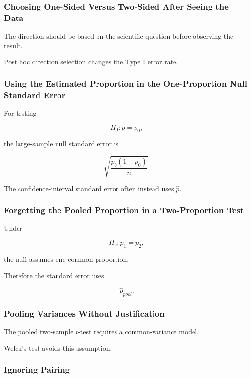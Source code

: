 \subsubsection{Choosing One-Sided Versus Two-Sided After Seeing the Data}

The direction should be based on the scientific question before
observing the result.

Post hoc direction selection changes the Type I error rate.

\subsubsection{Using the Estimated Proportion in the One-Proportion Null Standard Error}

For testing

\[
H_0:p=p_0,
\]

the large-sample null standard error is

\[
\boxed{
\sqrt{
\frac{
p_0(1-p_0)
}{n}
}.
}
\]

The confidence-interval standard error often instead uses
\(\widehat{p}\).

\subsubsection{Forgetting the Pooled Proportion in a Two-Proportion Test}

Under

\[
H_0:p_1=p_2,
\]

the null assumes one common proportion.

Therefore the standard error uses

\[
\boxed{
\widehat{p}_{pool}.
}
\]

\subsubsection{Pooling Variances Without Justification}

The pooled two-sample \(t\)-test requires a common-variance model.

Welch's test avoids this assumption.

\subsubsection{Ignoring Pairing}

